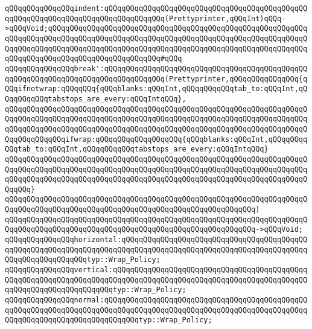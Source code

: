 \newline
\verb|qQQqqQQqqQQqqQQqindent:qQQqqQQqqQQqqQQqqQQqqQQqqQQqqQQqqQQqqQQqqQQqqQQqqQQqqQQqqQQqqQQqqQQqqQQqqQQqqQQqqQQq(Prettyprinter,qQQqInt)qQQq->qQQqVoid;qQQqqQQqqQQqqQQqqQQqqQQqqQQqqQQqqQQqqQQqqQQqqQQqqQQqqQQqqQQqqQQqqQQqqQQqqQQqqQQqqQQqqQQqqQQqqQQqqQQqqQQqqQQqqQQqqQQqqQQqqQQqqQQqqQQqqQQqqQQqqQQqqQQqqQQqqQQqqQQqqQQqqQQqqQQqqQQqqQQqqQQqqQQqqQQqqQQqqQQqqQQqqQQqqQQqqQQqqQQqqQQqqQQqqQQqqQQq#qQQq|\newline
\newline
\verb|qQQqqQQqqQQqqQQqbreak':qQQqqQQqqQQqqQQqqQQqqQQqqQQqqQQqqQQqqQQqqQQqqQQqqQQqqQQqqQQqqQQqqQQqqQQqqQQqqQQqqQQq(Prettyprinter,qQQqqQQqqQQqqQQq{qQQqifnotwrap:qQQqqQQq{qQQqblanks:qQQqInt,qQQqqQQqqQQqtab_to:qQQqInt,qQQqqQQqqQQqtabstops_are_every:qQQqIntqQQq},|\newline
\verb|qQQqqQQqqQQqqQQqqQQqqQQqqQQqqQQqqQQqqQQqqQQqqQQqqQQqqQQqqQQqqQQqqQQqqQQqqQQqqQQqqQQqqQQqqQQqqQQqqQQqqQQqqQQqqQQqqQQqqQQqqQQqqQQqqQQqqQQqqQQqqQQqqQQqqQQqqQQqqQQqqQQqqQQqqQQqqQQqqQQqqQQqqQQqqQQqqQQqqQQqqQQqqQQqqQQqqQQqqQQqqQQqifwrap:qQQqqQQqqQQqqQQqqQQq{qQQqblanks:qQQqInt,qQQqqQQqqQQqtab_to:qQQqInt,qQQqqQQqqQQqtabstops_are_every:qQQqIntqQQq}|\newline
\verb|qQQqqQQqqQQqqQQqqQQqqQQqqQQqqQQqqQQqqQQqqQQqqQQqqQQqqQQqqQQqqQQqqQQqqQQqqQQqqQQqqQQqqQQqqQQqqQQqqQQqqQQqqQQqqQQqqQQqqQQqqQQqqQQqqQQqqQQqqQQqqQQqqQQqqQQqqQQqqQQqqQQqqQQqqQQqqQQqqQQqqQQqqQQqqQQqqQQqqQQqqQQqqQQqqQQqqQQq}|\newline
\verb|qQQqqQQqqQQqqQQqqQQqqQQqqQQqqQQqqQQqqQQqqQQqqQQqqQQqqQQqqQQqqQQqqQQqqQQqqQQqqQQqqQQqqQQqqQQqqQQqqQQqqQQqqQQqqQQqqQQqqQQqqQQqqQQq)|\newline
\verb|qQQqqQQqqQQqqQQqqQQqqQQqqQQqqQQqqQQqqQQqqQQqqQQqqQQqqQQqqQQqqQQqqQQqqQQqqQQqqQQqqQQqqQQqqQQqqQQqqQQqqQQqqQQqqQQqqQQqqQQqqQQqqQQq->qQQqVoid;|\newline
\newline
\verb|qQQqqQQqqQQqqQQqhorizontal:qQQqqQQqqQQqqQQqqQQqqQQqqQQqqQQqqQQqqQQqqQQqqQQqqQQqqQQqqQQqqQQqqQQqqQQqqQQqqQQqqQQqqQQqqQQqqQQqqQQqqQQqqQQqqQQqqQQqqQQqqQQqqQQqqQQqtyp::Wrap_Policy;|\newline
\verb|qQQqqQQqqQQqqQQqvertical:qQQqqQQqqQQqqQQqqQQqqQQqqQQqqQQqqQQqqQQqqQQqqQQqqQQqqQQqqQQqqQQqqQQqqQQqqQQqqQQqqQQqqQQqqQQqqQQqqQQqqQQqqQQqqQQqqQQqqQQqqQQqqQQqqQQqqQQqqQQqtyp::Wrap_Policy;|\newline
\verb|qQQqqQQqqQQqqQQqnormal:qQQqqQQqqQQqqQQqqQQqqQQqqQQqqQQqqQQqqQQqqQQqqQQqqQQqqQQqqQQqqQQqqQQqqQQqqQQqqQQqqQQqqQQqqQQqqQQqqQQqqQQqqQQqqQQqqQQqqQQqqQQqqQQqqQQqqQQqqQQqqQQqqQQqtyp::Wrap_Policy;|\newline
